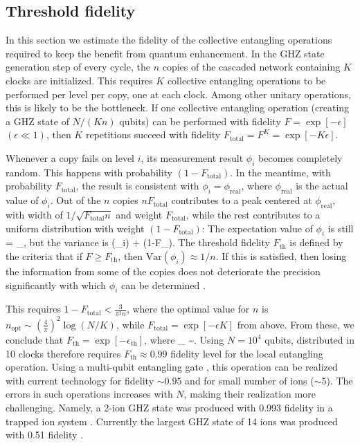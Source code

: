 \subsection{Threshold fidelity}
In this section we estimate the fidelity of the collective entangling operations
required to keep the benefit from quantum enhancement.
In the GHZ state generation step of every cycle, the $n$ copies of the cascaded
network containing $K$ clocks are initialized. This requires $K$ collective
entangling operations to be performed per level per copy, one at each clock.
Among other unitary operations, this is likely to be the bottleneck. If one
collective entangling operation (creating a GHZ state of $N/(Kn)$ qubits) can be
performed with fidelity $F = \exp[-\epsilon]$ $(\epsilon \ll 1)$, then $K$
repetitions succeed with fidelity $F_\mathrm{total} = F^{K}= \exp[-K\epsilon ]$.

Whenever a copy fails on level $i$, its measurement result $\phi_i$ becomes
completely random. This happens with probability
$(1-F_\mathrm{total})$.
In the meantime, with probability $F_\mathrm{total}$, the result is consistent with
$\phi_i = \phi_\mathrm{real}$, where $\phi_\mathrm{real}$ is the actual value of
$\phi_i $. Out of the $n$ copies $nF_\mathrm{total}$ contributes to a peak
centered at $\phi_\mathrm{real}$, with width of $1/\sqrt{F_\mathrm{total}n}$ and
weight $F_\mathrm{total}$, while the rest contributes to a uniform distribution
with weight $(1-F_\mathrm{total})$:
The expectation value of $\phi_i$ is still
\bel
 	 = \phi_,
\eel
but the variance is
 \bel
 	(\phi_i) \approx {} +
 	(1-F_).
 \eel 
The threshold fidelity $F_\mathrm{th}$ is defined by the criteria that if $F \geq
F_\mathrm{th}$, then $\mathrm{Var}(\phi_i) \approx 1/n$. If this is satisfied, then
losing the information from some of the copies does not deteriorate
 the precision significantly with which $\phi_i$ can be determined .

This requires $1-F_\mathrm{total} < \frac{3}{\pi^2 n}$, where the optimal value
for $n$ is $n_\mathrm{opt}\sim \left(\frac{4}{\pi}\right)^2\log(N/K)$, while
$F_\mathrm{total}= \exp[-\epsilon K]$ from above. From these, we conclude that $F_\mathrm{th} =
\exp[-\epsilon_\mathrm{th}]$, where
\bel
	\epsilon_ \approx {} \sim {}.
\eel 
 Using $N=10^4$ qubits, distributed in 10 clocks  therefore requires
 $F_\mathrm{th} \approx 0.99$ fidelity level for the local entangling operation.
Using a multi-qubit entangling gate \cite{MSgate}, this operation can be
realized with current technology for fidelity $\sim 0.95$ and for
small number of ions ($\sim 5$). \cite{Monz2011} The errors in such operations
increases with $N$, making their realization more challenging. Namely, a 2-ion
GHZ state was produced with 0.993 fidelity in a trapped ion system
\cite{blatt1}.
Currently the largest GHZ state of 14 ions was produced with 0.51 fidelity
\cite{Monz2011}.
